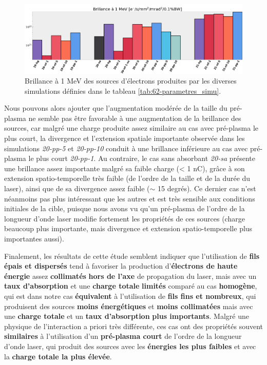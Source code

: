 \begin{refsection}
\begin{figure}[hbtp]
	\centering
	\includegraphics[width=\linewidth]{6-opti_numerique/absorber_brillance_electron_cibles.png}
	\caption{Brillance à 1 MeV des sources d'électrons produites par les diverses simulations définies dans le tableau \ref{tab:62-parametres_simu}.}
	\label{fig:62-brillance_cibles}
\end{figure}

Nous pouvons alors ajouter que l'augmentation modérée de la taille du pré-plasma ne semble pas être favorable à une augmentation de la brillance des sources, car malgré une charge produite assez similaire au cas avec pré-plasma le plus court, la divergence et l'extension spatiale importante observée dans les simulations \textit{20-pp-5} et \textit{20-pp-10} conduit à une brillance inférieure au cas avec pré-plasma le plus court \textit{20-pp-1}. Au contraire, le cas sans absorbant \textit{20-sa} présente une brillance assez importante malgré sa faible charge (< 1 nC), grâce à son extension spatio-temporelle très faible (de l'ordre de la taille et de la durée du laser), ainsi que de sa divergence assez faible ($\sim$ 15 degrés). Ce dernier cas n'est néanmoins pas plus intéressant que les autres et est très sensible aux conditions initiales de la cible, puisque nous avons vu qu'un pré-plasma de l'ordre de la longueur d'onde laser modifie fortement les propriétés de ces sources (charge beaucoup plus importante, mais divergence et extension spatio-temporelle plus importantes aussi).

Finalement, les résultats de cette étude semblent indiquer que l'utilisation de \textbf{fils épais et dispersés} tend à favoriser la production d'\textbf{électrons de haute énergie} assez \textbf{collimatés} \textbf{hors de l'axe} de propagation du laser, mais avec un \textbf{taux d'absorption} et une \textbf{charge totale} \textbf{limités} comparé au cas \textbf{homogène}, qui est dans notre cas \textbf{équivalent} à l'utilisation de \textbf{fils fins et nombreux}, qui produisent des sources \textbf{moins énergétiques} et \textbf{moins collimatées} mais avec une \textbf{charge totale} et un \textbf{taux d'absorption} \textbf{plus importants}. Malgré une physique de l'interaction a priori très différente, ces cas ont des propriétés souvent \textbf{similaires} à l'utilisation d'un \textbf{pré-plasma court} de l'ordre de la longueur d'onde laser, qui produit des sources avec les \textbf{énergies les plus faibles} et avec la \textbf{charge totale la plus élevée}. 


\end{refsection}
